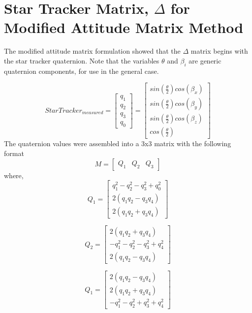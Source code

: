 \documentclass[12pt,a4paper]{book}
\begin{document}
\section{Star Tracker Matrix, $\Delta$ for Modified Attitude Matrix Method}
The modified attitude matrix formulation showed that the $\Delta$ matrix begins with the star tracker quaternion.  Note that the variables $\theta$ and $\beta_{i}$ are generic quaternion components, for use in the general case.

\begin{equation}
StarTracker_{measured} = 
\begin{bmatrix}
q_{1}\\
q_{2}\\
q_{3}\\
q_{0}
\end{bmatrix} = 
\begin{bmatrix}
sin(\frac{\theta}{2})cos(\beta_{x})\\
sin(\frac{\theta}{2})cos(\beta_{y})\\
sin(\frac{\theta}{2})cos(\beta_{z})\\
cos(\frac{\theta}{2})
\end{bmatrix}
\end{equation}
The quaternion values were assembled into a 3x3 matrix with the following format
\begin{equation}
M = \begin{bmatrix}
Q_{1} & Q_{2} & Q_{3}
\end{bmatrix}
\end{equation}
where,
\begin{equation}
Q_{1} = \begin{bmatrix}
q_{1}^{2} - q_{2}^{2} - q_{3}^{2} + q_{0}^{2}\\
2(q_{1}q_{2} - q_{3}q_{4})\\
2(q_{1}q_{2} + q_{3}q_{4})
\end{bmatrix}
\end{equation}

\begin{equation}
Q_{2} = \begin{bmatrix}
2(q_{1}q_{2} + q_{3}q_{4})\\
-q_{1}^{2} - q_{2}^{2} - q_{3}^{2} + q_{4}^{2}\\
2(q_{1}q_{2} - q_{3}q_{4})
\end{bmatrix}
\end{equation}

\begin{equation}
Q_{1} = \begin{bmatrix}
2(q_{1}q_{2} - q_{3}q_{4})\\
2(q_{1}q_{2} + q_{3}q_{4})\\
-q_{1}^{2} - q_{2}^{2} + q_{3}^{2} + q_{4}^{2}
\end{bmatrix}
\end{equation}
\end{document}
